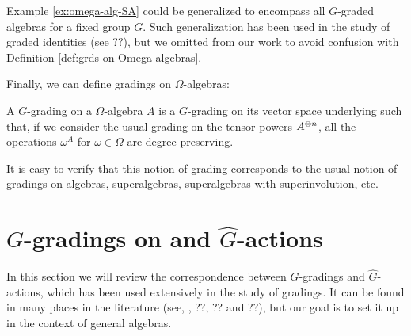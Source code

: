 \begin{remark}
    Example \ref{ex:omega-alg-SA} could be generalized to encompass all $G$-graded algebras for a fixed group $G$. 
    Such generalization has been used in the study of graded identities (see ??), but we omitted from our work to avoid confusion with Definition \ref{def:grds-on-Omega-algebras}.
\end{remark}

Finally, we can define gradings on $\Omega$-algebras:

\begin{defi}\label{def:grds-on-Omega-algebras}
    A $G$-grading on a $\Omega$-algebra $A$ is a $G$-grading on its vector space underlying such that, if we consider the usual grading on the tensor powers $A^{\otimes n}$, all the operations $\omega^A$ for $\omega \in \Omega$ are degree preserving.
\end{defi}

It is easy to verify that this notion of grading corresponds to the usual notion of gradings on algebras, superalgebras, superalgebras with superinvolution, etc.



\section{$G$-gradings on  and $\widehat G$-actions}

In this section we will review the correspondence between $G$-gradings and $\widehat G$-actions, which has been used extensively in the study of gradings. 
It can be found in many places in the literature (see, \eg, ??, ?? and ??), but our goal is to set it up in the context of general algebras. 

